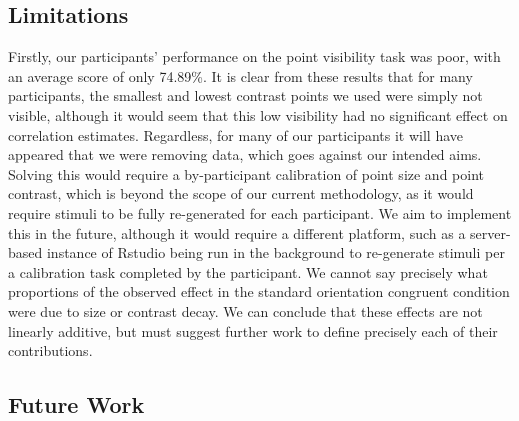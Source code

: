 \documentclass[manuscript, anonymous, screen]{acmart}
\begin{document}
\hypertarget{sec-limitations}{%
\subsection{Limitations}\label{sec-limitations}}

Firstly, our participants' performance on the point visibility task was
poor, with an average score of only 74.89\%. It is clear from these
results that for many participants, the smallest and lowest contrast
points we used were simply not visible, although it would seem that this
low visibility had no significant effect on correlation estimates.
Regardless, for many of our participants it will have appeared that we
were removing data, which goes against our intended aims. Solving this
would require a by-participant calibration of point size and point
contrast, which is beyond the scope of our current methodology, as it
would require stimuli to be fully re-generated for each participant. We
aim to implement this in the future, although it would require a
different platform, such as a server-based instance of Rstudio being run
in the background to re-generate stimuli per a calibration task
completed by the participant. We cannot say precisely what proportions
of the observed effect in the standard orientation congruent condition
were due to size or contrast decay. We can conclude that these effects
are not linearly additive, but must suggest further work to define
precisely each of their contributions.

\hypertarget{sec-future-work}{%
\subsection{Future Work}\label{sec-future-work}}
\end{document}
